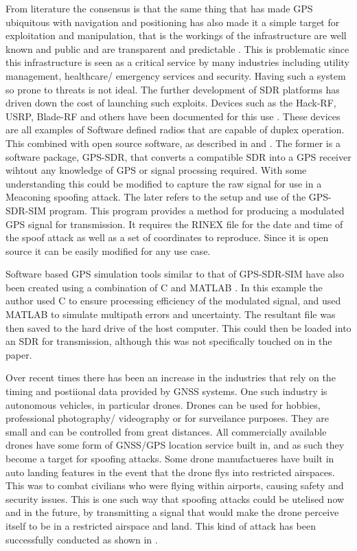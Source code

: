 From literature the consensus is that the same thing that has made GPS ubiquitous with navigation and 
positioning has also made it a simple target for exploitation and manipulation, that is the workings
of the infrastructure are well known and public and are transparent and predictable \cite{RN7} \cite{RN4}. This is problematic since this infrastructure
is seen as a critical service by many industries including utility management, healthcare/ emergency services and security.
Having such a system so prone to threats is not ideal. The further development of SDR platforms has driven down the cost of launching
such exploits. Devices such as the Hack-RF, USRP, Blade-RF and others have been documented for this use \cite{RN4} \cite{RN9}. These devices are all examples of Software
defined radios that are capable of duplex operation. This combined with open source software, as described in \cite{RN16} and \cite{RN57}. The former is a software
package, GPS-SDR, that converts a compatible SDR into a GPS receiver wihtout any knowledge of GPS or signal procssing required. With some understanding this could be
modified to capture the raw signal for use in a Meaconing spoofing attack. The later refers to the setup and use of the GPS-SDR-SIM program. This program provides a
method for producing a modulated GPS signal for transmission. It requires the RINEX file for the date and time of the spoof attack as well as a set of coordinates to
reproduce. Since it is open source it can be easily modified for any use case. 

Software based GPS simulation tools similar to that of GPS-SDR-SIM have also been created using a combination of C and MATLAB \cite{RN15}. In this example the author used
C to ensure processing efficiency of the modulated signal, and used MATLAB to simulate multipath errors and uncertainty. The resultant file was then saved to the hard
drive of the host computer. This could then be loaded into an SDR for transmission, although this was not specifically touched on in the paper.

Over recent times there has been an increase in the industries that rely on the timing and postiional data provided by GNSS systems. One such industry is autonomous
vehicles, in particular drones. Drones can be used for hobbies, professional photography/ videography or for surveilance purposes. They are small and can be controlled from great
distances. All commercially available drones have some form of GNSS/GPS location service built in, and as such they become a target for spoofing attacks. Some drone
manufactueres have built in auto landing features in the event that the drone flys into restricted airspaces. This was to combat civilians who were flying within
airports, causing safety and security issues. This is one such way that spoofing attacks could be utelised now and in the future, by transmitting a signal that would make
the drone perceive itself to be in a restricted airspace and land. This kind of attack has been successfully conducted as shown in \cite{RN4}. 

